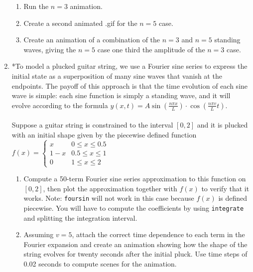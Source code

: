 \documentclass[10.5pt,twoside]{report}
\theoremstyle{definition}
\begin{document}
\begin{enumerate}
 \begin{enumerate}
 
 \item Run the $n=3$ animation.
 
 \item Create a second animated .gif for the $n=5$ case. 
 
 \item Create an animation of a combination of the $n=3$ and $n=5$ standing waves, giving the $n=5$ case one third the amplitude of the $n=3$ case.

 \end{enumerate}

\item *To model a plucked guitar string, we use a Fourier sine series to express the initial state as a superposition of many sine waves that vanish at the endpoints.  The payoff of this approach is that the time evolution of each sine wave is simple:  each sine function is simply a standing wave, and it will evolve according to the formula $y(x,t)=A\sin \left(\frac{n\pi x}{L} \right)\cdot \cos \left(\frac{n\pi v}{L} t\right)$.\\

${}$\\

Suppose a guitar string is constrained to the interval $[0,2]$ and it is plucked with an initial shape given by the piecewise defined function 
$f(x)=
\begin{cases}
 x & 0 \leq x \leq 0.5\\
 1-x & 0.5 \leq x \leq 1\\
 0 &  1 \leq x \leq 2
\end{cases}$

\begin{enumerate}

\item Compute a 50-term Fourier sine series approximation to this function on $[0,2]$, then plot the approximation together with $f(x)$ to verify that it works.  Note:  \verb|foursin| will not work in this case because $f(x)$ is defined piecewise.  You will have to  compute the coefficients by using \verb|integrate| and splitting the integration interval.

\item Assuming $v=5$, attach the correct time dependence to each term in the Fourier expansion and create an animation showing how the shape of the string evolves for twenty seconds after the initial pluck.  Use time steps of 0.02 seconds to compute scenes for the animation.


\end{enumerate}
\end{enumerate}
\end{document}
